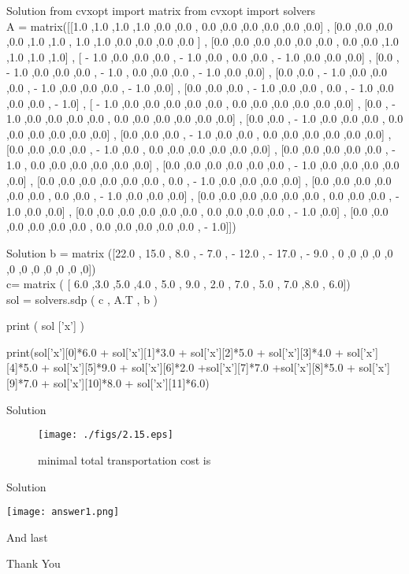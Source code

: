 \documentclass{beamer}
\begin{document}
\begin{frame}{Solution}
from cvxopt import matrix
from cvxopt import solvers\\
A = matrix([[1.0 ,1.0 ,1.0 ,1.0 ,0.0 ,0.0 ,
0.0 ,0.0 ,0.0 ,0.0 ,0.0 ,0.0] ,
[0.0 ,0.0 ,0.0 ,0.0 ,1.0 ,1.0 ,
1.0 ,1.0 ,0.0 ,0.0 ,0.0 ,0.0 ] ,
[0.0 ,0.0 ,0.0 ,0.0 ,0.0 ,0.0 ,
0.0 ,0.0 ,1.0 ,1.0 ,1.0 ,1.0] ,
[ - 1.0 ,0.0 ,0.0 ,0.0 , - 1.0 ,0.0 ,
0.0 ,0.0 , - 1.0 ,0.0 ,0.0 ,0.0] ,
[0.0 , - 1.0 ,0.0 ,0.0 ,0.0 , - 1.0 ,
0.0 ,0.0 ,0.0 , - 1.0 ,0.0 ,0.0] ,
[0.0 ,0.0 , - 1.0 ,0.0 ,0.0 ,0.0 ,
- 1.0 ,0.0 ,0.0 ,0.0 , - 1.0 ,0.0] ,
[0.0 ,0.0 ,0.0 , - 1.0 ,0.0 ,0.0 ,
0.0 , - 1.0 ,0.0 ,0.0 ,0.0 , - 1.0] ,
[ - 1.0 ,0.0 ,0.0 ,0.0 ,0.0 ,0.0 ,
0.0 ,0.0 ,0.0 ,0.0 ,0.0 ,0.0] ,
[0.0 , - 1.0 ,0.0 ,0.0 ,0.0 ,0.0 ,
0.0 ,0.0 ,0.0 ,0.0 ,0.0 ,0.0] ,
[0.0 ,0.0 , - 1.0 ,0.0 ,0.0 ,0.0 ,
0.0 ,0.0 ,0.0 ,0.0 ,0.0 ,0.0] ,
[0.0 ,0.0 ,0.0 , - 1.0 ,0.0 ,0.0 ,
0.0 ,0.0 ,0.0 ,0.0 ,0.0 ,0.0] ,
[0.0 ,0.0 ,0.0 ,0.0 , - 1.0 ,0.0 ,
0.0 ,0.0 ,0.0 ,0.0 ,0.0 ,0.0] ,
[0.0 ,0.0 ,0.0 ,0.0 ,0.0 , - 1.0 ,
0.0 ,0.0 ,0.0 ,0.0 ,0.0 ,0.0] ,
[0.0 ,0.0 ,0.0 ,0.0 ,0.0 ,0.0 ,
- 1.0 ,0.0 ,0.0 ,0.0 ,0.0 ,0.0] ,
[0.0 ,0.0 ,0.0 ,0.0 ,0.0 ,0.0 ,
0.0 , - 1.0 ,0.0 ,0.0 ,0.0 ,0.0] ,
[0.0 ,0.0 ,0.0 ,0.0 ,0.0 ,0.0 ,
0.0 ,0.0 , - 1.0 ,0.0 ,0.0 ,0.0] ,
[0.0 ,0.0 ,0.0 ,0.0 ,0.0 ,0.0 ,
0.0 ,0.0 ,0.0 , - 1.0 ,0.0 ,0.0] ,
[0.0 ,0.0 ,0.0 ,0.0 ,0.0 ,0.0 ,
0.0 ,0.0 ,0.0 ,0.0 , - 1.0 ,0.0] ,
[0.0 ,0.0 ,0.0 ,0.0 ,0.0 ,0.0 ,
0.0 ,0.0 ,0.0 ,0.0 ,0.0 , - 1.0]])

\end{frame}


\begin{frame}{Solution}
b = matrix ([22.0 , 15.0 , 8.0 ,
- 7.0 , - 12.0 , - 17.0 ,
- 9.0 ,
0 ,0 ,0 ,0 ,0 ,0 ,0 ,0 ,0 ,0 ,0 ,0])\\
c= matrix ( [ 6.0 ,3.0 ,5.0 ,4.0 ,
5.0 , 9.0 , 2.0 , 7.0 , 5.0 , 7.0 ,8.0 , 6.0])\\
sol = solvers.sdp ( c , A.T , b )

print ( sol ['x'] )

print(sol['x'][0]*6.0 + sol['x'][1]*3.0 + sol['x'][2]*5.0 + sol['x'][3]*4.0 + sol['x'][4]*5.0 + sol['x'][5]*9.0 + sol['x'][6]*2.0 +sol['x'][7]*7.0 +sol['x'][8]*5.0 + sol['x'][9]*7.0 + sol['x'][10]*8.0 + sol['x'][11]*6.0)
\end{frame}
\begin{frame}{Solution}

\begin{figure}[!ht]
\centering
\texttt{[image: ./figs/2.15.eps]}
\caption{ minimal total transportation cost is}
\label{fig.2.15}	
\end{figure}
%

\end{frame}


\begin{frame}{Solution}
\begin{center}
    \texttt{[image: answer1.png]}
\end{center}
\end{frame}
\begin{frame}{And last}
\begin{center}
    Thank You
\end{center}
\end{frame}
\end{document}
